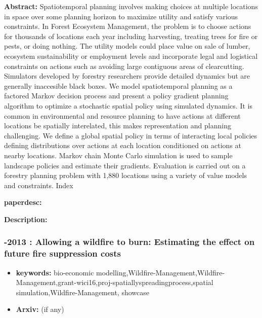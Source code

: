 \documentclass{article}
\begin{document}
\textbf{Abstract:} Spatiotemporal planning involves making choices at multiple locations in space over some planning horizon to maximize utility and satisfy various constraints. In Forest Ecosystem Management, the problem is to choose actions for thousands of locations each year including harvesting, treating trees for fire or pests, or doing nothing. The utility models could place value on sale of lumber, ecosystem sustainability or employment levels and incorporate legal and logistical constraints on actions such as avoiding large contiguous areas of clearcutting. Simulators developed by forestry researchers provide detailed dynamics but are generally inaccesible black boxes. We model spatiotemporal planning as a factored Markov decision process and present a policy gradient planning algorithm to optimize a stochastic spatial policy using simulated dynamics. It is common in environmental and resource planning to have actions at different locations be spatially interelated, this makes representation and planning challenging. We define a global spatial policy in terms of interacting local policies defining distributions over actions at each location conditioned on actions at nearby locations. Markov chain Monte Carlo simulation is used to sample landscape policies and estimate their gradients. Evaluation is carried out on a forestry planning problem with 1,880 locations using a variety of value models and constraints. Index

\textbf{paperdesc:} 

\textbf{Description:} 



\newpage
\subsubsection{\textbf{-2013} : Allowing a wildfire to burn: Estimating the effect on future fire suppression costs}
\begin{itemize}
\item \textbf{keywords:} bio-economic modelling,Wildfire-Management,Wildfire-Management,grant-wici16,proj-spatiallyspreadingprocess,spatial simulation,Wildfire-Management, showcase
\item \textbf{Arxiv:}  (if any)
\end{itemize}
\end{document}
